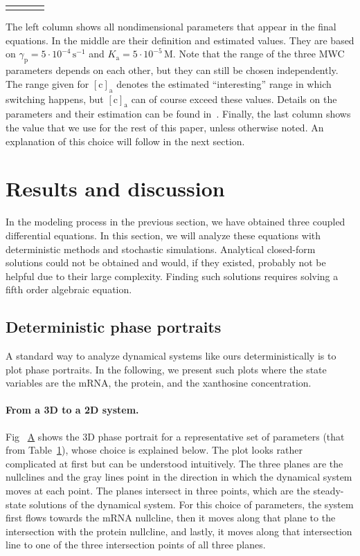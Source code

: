 \documentclass[10pt,letterpaper]{article}
\newlength\savedwidth
\newcommand\thickhline{\noalign{\global\savedwidth\arrayrulewidth\global\arrayrulewidth 2pt}%
\hline
\noalign{\global\arrayrulewidth\savedwidth}}
\newcommand{\unit}[1]{\,\mathrm{#1}}
\newcommand{\n}[1]{\mathrm{#1}}
\newcommand\subref[2]{%
	\def\myref{\getrefnumber{#1}}%
	\hyperref[#1]{\myref\mbox{#2}}%
}
\begin{document}
\begin{table}
\begin{tabular}{rllr}
		\thickhline
	\end{tabular}
	\begin{flushleft} 
		The left column shows all nondimensional parameters that appear in
		the final equations. In the middle are their definition and
		estimated values. They are based on $\gamma_{\n{p}} = 5 \cdot
		10^{-4} \unit{s^{-1}}$ and $K_{\n{a}} = 5 \cdot 10^{-5} \unit{M}$.
		Note that the range of the three MWC parameters depends on each
		other, but they can still be chosen independently. The range given
		for $\n{[c]_{a}}$ denotes the estimated ``interesting'' range in
		which switching happens, but $\n{[c]_{a}}$ can of course exceed
		these values. Details on the parameters and their estimation can be
		found in~. Finally, the last column shows the value
		that we use for the rest of this paper, unless otherwise noted. An
		explanation of this choice will follow in the next section.
	\end{flushleft}
	\label{table1:nondim}
\end{table}


\section*{Results and discussion}
In the modeling process in the previous section, we have obtained three
coupled differential equations. In this section, we will analyze these
equations with deterministic methods and stochastic simulations. Analytical
closed-form solutions could not be obtained and would, if they existed,
probably not be helpful due to their large complexity. Finding such
solutions requires solving a fifth order algebraic equation.

\subsection*{Deterministic phase portraits}
A standard way to analyze dynamical systems like ours deterministically is
to plot phase portraits. In the following, we present such plots where the
state variables are the mRNA, the protein, and the xanthosine concentration.

\paragraph*{From a 3D to a 2D system.} 
Fig~\subref{fig4:bistability}{A} shows the 3D phase portrait for a
representative set of parameters (that from Table~\ref{table1:nondim}),
whose choice is explained below. The plot looks rather complicated at first
but can be understood intuitively. The three planes are the nullclines and
the gray lines point in the direction in which the dynamical system moves at
each point. The planes intersect in three points, which are the steady-state
solutions of the dynamical system. For this choice of parameters, the system
first flows towards the mRNA nullcline, then it moves along that plane to
the intersection with the protein nullcline, and lastly, it moves along that
intersection line to one of the three intersection points of all three
planes.
\end{document}
